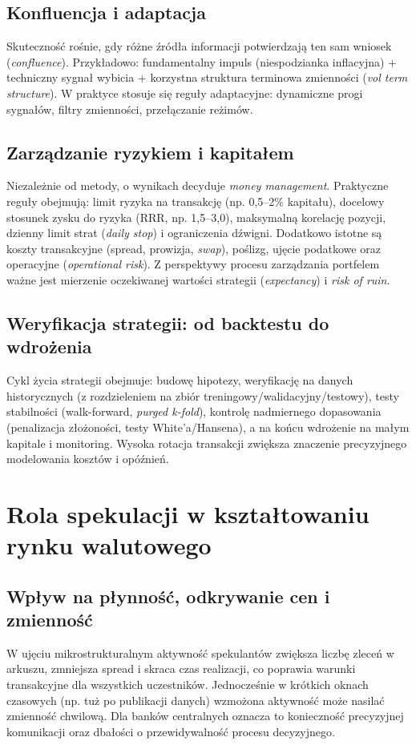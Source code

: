 \subsection{Konfluencja i adaptacja}
Skuteczność rośnie, gdy różne źródła informacji potwierdzają ten sam wniosek (\emph{confluence}). Przykładowo: fundamentalny impuls (niespodzianka inflacyjna) + techniczny sygnał wybicia + korzystna struktura terminowa zmienności (\emph{vol term structure}). W praktyce stosuje się reguły adaptacyjne: dynamiczne progi sygnałów, filtry zmienności, przełączanie reżimów.

\subsection{Zarządzanie ryzykiem i kapitałem}
Niezależnie od metody, o wynikach decyduje \emph{money management}. Praktyczne reguły obejmują: limit ryzyka na transakcję (np. 0{,}5–2\% kapitału), docelowy stosunek zysku do ryzyka (RRR, np. 1{,}5–3{,}0), maksymalną korelację pozycji, dzienny limit strat (\emph{daily stop}) i ograniczenia dźwigni. Dodatkowo istotne są koszty transakcyjne (spread, prowizja, \emph{swap}), poślizg, ujęcie podatkowe oraz operacyjne (\emph{operational risk}). Z perspektywy procesu zarządzania portfelem ważne jest mierzenie oczekiwanej wartości strategii (\emph{expectancy}) i \emph{risk of ruin}.

\subsection{Weryfikacja strategii: od backtestu do wdrożenia}
Cykl życia strategii obejmuje: budowę hipotezy, weryfikację na danych historycznych (z rozdzieleniem na zbiór treningowy/walidacyjny/testowy), testy stabilności (walk-forward, \emph{purged k-fold}), kontrolę nadmiernego dopasowania (penalizacja złożoności, testy White’a/Hansena), a na końcu wdrożenie na małym kapitale i monitoring. Wysoka rotacja transakcji zwiększa znaczenie precyzyjnego modelowania kosztów i opóźnień.

\section{Rola spekulacji w kształtowaniu rynku walutowego}

\subsection{Wpływ na płynność, odkrywanie cen i zmienność}
W ujęciu mikrostrukturalnym aktywność spekulantów zwiększa liczbę zleceń w arkuszu, zmniejsza spread i skraca czas realizacji, co poprawia warunki transakcyjne dla wszystkich uczestników. Jednocześnie w krótkich oknach czasowych (np. tuż po publikacji danych) wzmożona aktywność może nasilać zmienność chwilową. Dla banków centralnych oznacza to konieczność precyzyjnej komunikacji oraz dbałości o przewidywalność procesu decyzyjnego.

